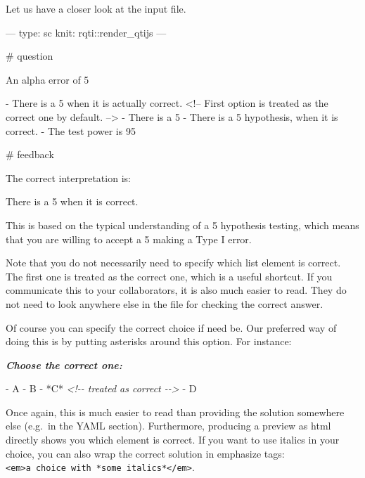 \documentclass[twoside]{tufte-book}
\newenvironment{Shaded}{}{}
\newcommand{\AnnotationTok}[1]{\textcolor[rgb]{0.38,0.63,0.69}{\textbf{\textit{#1}}}}
\newcommand{\CommentTok}[1]{\textcolor[rgb]{0.38,0.63,0.69}{\textit{#1}}}
\newcommand{\NormalTok}[1]{#1}
\newcommand{\SpecialStringTok}[1]{\textcolor[rgb]{0.73,0.40,0.53}{#1}}
\begin{document}
Let us have a closer look at the input file.

\begin{Shaded}
\begin{Highlighting}
---
type: sc
knit: rqti::render_qtijs
---

# question

An alpha error of 5%

- There is a 5%
when it is actually correct. <!-- First option is treated as the correct one by
default. -->
- There is a 5%
- There is a 5%
hypothesis, when it is correct.
- The test power is 95%

# feedback

The correct interpretation is:

There is a 5%
when it is correct.

This is based on the typical understanding of a 5%
hypothesis testing, which means that you are willing to accept a 5%
making a Type I error.
\end{Highlighting}
\end{Shaded}

Note that you do not necessarily need to specify which list element is correct. The first one is treated as the correct one, which is a useful shortcut. If you communicate this to your collaborators, it is also much easier to read. They do not need to look anywhere else in the file for checking the correct answer.

Of course you can specify the correct choice if need be. Our preferred way of doing this is by putting asterisks around this option. For instance:

\begin{Shaded}
\begin{Highlighting}[]
\AnnotationTok{Choose the correct one:}

\SpecialStringTok{{-} }\NormalTok{A}
\SpecialStringTok{{-} }\NormalTok{B}
\SpecialStringTok{{-} }\NormalTok{*C* }\CommentTok{\textless{}!{-}{-} treated as correct {-}{-}\textgreater{}}
\SpecialStringTok{{-} }\NormalTok{D}
\end{Highlighting}
\end{Shaded}

Once again, this is much easier to read than providing the solution somewhere else (e.g.~in the YAML section). Furthermore, producing a preview as html directly shows you which element is correct. If you want to use italics in your choice, you can also wrap the correct solution in emphasize tags: \texttt{\textless{}em\textgreater{}a\ choice\ with\ *some\ italics*\textless{}/em\textgreater{}}.
\end{document}
